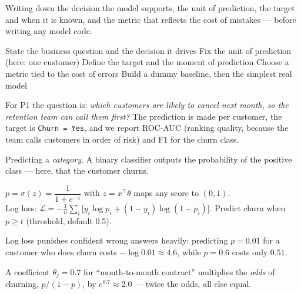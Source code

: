 \documentclass[11pt,a4paper]{article}
\begin{document}

\begin{bdef}
Writing down the decision the model supports, the unit of prediction, the target and when it is known, and the metric that reflects the cost of mistakes --- before writing any model code.
\end{bdef}
\begin{balgo}
\begin{algorithmic}[1]
\State State the business question and the decision it drives
\State Fix the unit of prediction (here: one customer)
\State Define the target and the moment of prediction
\State Choose a metric tied to the cost of errors
\State Build a dummy baseline, then the simplest real model
\end{algorithmic}
\end{balgo}
For P1 the question is: \emph{which customers are likely to cancel next month, so the retention team can call them first?} The prediction is made per customer, the target is \texttt{Churn = Yes}, and we report ROC-AUC (ranking quality, because the team calls customers in order of risk) and F1 for the churn class.

\begin{bdef}[Classification]
Predicting a \emph{category}. A binary classifier outputs the probability of the positive class --- here, that the customer churns.
\end{bdef}
\begin{bmath}
$p=\sigma(z)=\dfrac{1}{1+e^{-z}}$ with $z=x^\top\theta$ maps any score to $(0,1)$.\\[3pt]
Log loss: $\mathcal{L}=-\frac1n\sum_i\big[y_i\log p_i+(1-y_i)\log(1-p_i)\big]$. Predict churn when $p\ge t$ (threshold, default 0.5).
\end{bmath}
Log loss punishes confident wrong answers heavily: predicting $p=0.01$ for a customer who does churn costs $-\log 0.01\approx4.6$, while $p=0.6$ costs only $0.51$.
\begin{bex}
A coefficient $\theta_j=0.7$ for ``month-to-month contract'' multiplies the \emph{odds} of churning, $p/(1-p)$, by $e^{0.7}\approx2.0$ --- twice the odds, all else equal.
\end{bex}
\end{document}
